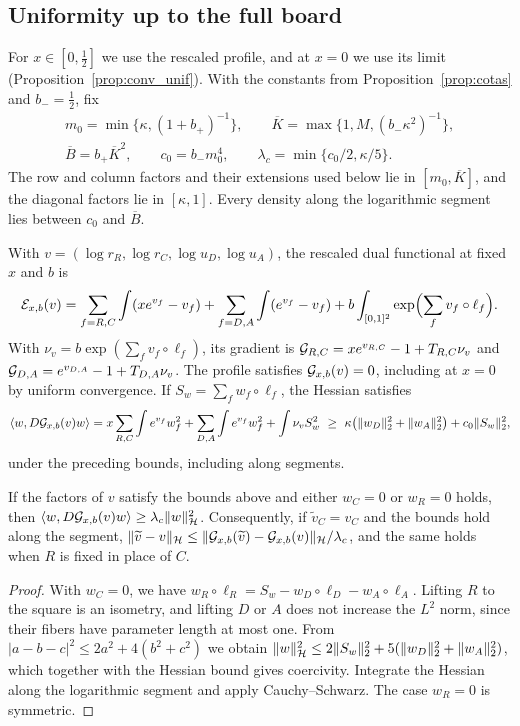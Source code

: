 \subsection{Uniformity up to the full board}

For $x\in[0,\frac12]$ we use the rescaled profile, and at $x=0$ we use its limit (Proposition~\ref{prop:conv_unif}). With the constants
from Proposition~\ref{prop:cotas} and $b_-=\frac12$, fix \begin{gather*}
 m_0=\min\{\kappa,(1+b_+)^{-1}\},\qquad \overline K=\max\{1,M,(b_-\kappa^2)^{-1}\},\\
 \overline B=b_+\overline K^2,\qquad c_0=b_-m_0^4,\qquad \lambda_c=\min\{c_0/2,\kappa/5\}.
\end{gather*} The row and column factors and their extensions used below lie in $[m_0,\overline K]$, and the diagonal factors lie in
$[\kappa,1]$. Every density along the logarithmic segment lies between $c_0$ and $\overline B$.

With $v=(\log r_R,\log r_C,\log u_D,\log u_A)$, the rescaled dual functional at fixed $x$ and $b$ is \[
 {\mathcal{E}}_{x,b}(v)=\sum_{f=R,C}\int(xe^{v_f}-v_f)+\sum_{f=D,A}\int(e^{v_f}-v_f)
 +b\int_{[0,1]^2}\exp\Bigl(\sum_fv_f\circ\ell_f\Bigr).
\] With $\nu_v=b\exp(\sum_fv_f\circ\ell_f)$, its gradient is ${\mathcal{G}}_{R,C}=xe^{v_{R,C}}-1+T_{R,C}\nu_v$ and
${\mathcal{G}}_{D,A}=e^{v_{D,A}}-1+T_{D,A}\nu_v$. The profile satisfies ${\mathcal{G}}_{x,b}(v)=0$, including at $x=0$ by uniform convergence. If
$S_w=\sum_fw_f\circ\ell_f$, the Hessian satisfies \[
 \langle w,D{\mathcal{G}}_{x,b}(v)w\rangle=x\sum_{R,C}\int e^{v_f}w_f^2+\sum_{D,A}\int e^{v_f}w_f^2+\int\nu_vS_w^2
 \ \ge\ \kappa\bigl(\|w_D\|_2^2+\|w_A\|_2^2\bigr)+c_0\|S_w\|_2^2 ,
\] under the preceding bounds, including along segments.

\begin{lema}\label{lem:coercividad} If the factors of $v$ satisfy the bounds above and
either $w_C=0$ or $w_R=0$ holds, then $\langle w,D{\mathcal{G}}_{x,b}(v)w\rangle\ge\lambda_c\|w\|_{\mathcal{H}}^2$. Consequently, if $\widetilde v_C=v_C$
and the bounds hold along the segment, $\|\widetilde v-v\|_{\mathcal{H}}\le\|{\mathcal{G}}_{x,b}(\widetilde v)-{\mathcal{G}}_{x,b}(v)\|_{\mathcal{H}}/\lambda_c$, and the same
holds when $R$ is fixed in place of $C$. \end{lema}

\begin{proof} With $w_C=0$, we have $w_R\circ\ell_R=S_w-w_D\circ\ell_D-w_A\circ\ell_A$. Lifting $R$ to the square is an isometry, and
lifting $D$ or $A$ does not increase the $L^2$ norm, since their fibers have parameter length at most one. From
$|a-b-c|^2\le2a^2+4(b^2+c^2)$ we obtain $\|w\|_{\mathcal{H}}^2\le2\|S_w\|_2^2+5(\|w_D\|_2^2+\|w_A\|_2^2)$, which together with the Hessian bound
gives coercivity. Integrate the Hessian along the logarithmic segment and apply Cauchy--Schwarz. The case $w_R=0$ is symmetric.
\end{proof}

